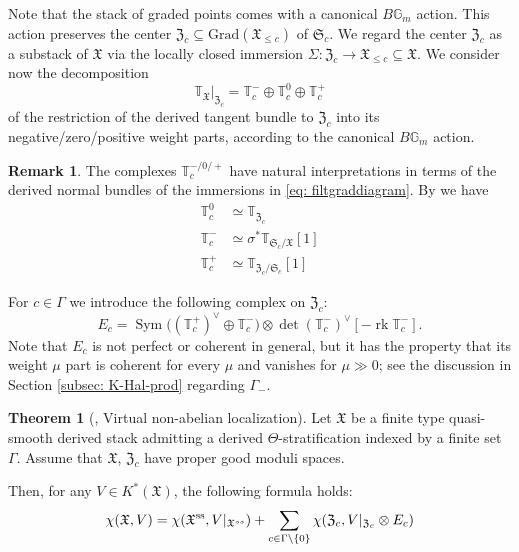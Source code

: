 \documentclass[12pt]{amsart}
\theoremstyle{definition}
\newtheorem{theorem}[definition]{Theorem}
\newtheorem{remark}[definition]{Remark}
\newcommand{\BG}{{\mathbb{G}}}
\newcommand{\BT}{{\mathbb{T}}}
\newcommand{\1}{\mathbf 1}
\newcommand{\FX}{{\mathfrak{X}}}
\newcommand{\FZ}{{\mathfrak{Z}}}
\newcommand{\FS}{{\mathfrak{S}}}
\DeclareMathOperator{\Sym}{Sym}
\newcommand{\Grad}{\mathrm{Grad}}
\begin{document}
Note that the stack of graded points comes with a canonical $B\BG_m$ action. This action preserves the center $\FZ_c\subseteq \Grad(\FX_{\leq c})$ of $\FS_c$. We regard the center $\FZ_c$ as a substack of $\FX$ via the locally closed immersion $\Sigma\colon \FZ_c\to \FX_{\leq c}\subseteq \FX$. We consider now the decomposition
\[\BT_\FX|_{\FZ_c}=\BT_c^-\oplus\BT_c^0\oplus \BT_c^+\]
of the restriction of the derived tangent bundle to $\FZ_c$ into its negative/zero/positive weight parts, according to the canonical $B\BG_m$ action. 

\begin{remark}\label{rmk: interpretationL-+}
The complexes $\BT_c^{-/0/+}$ have natural interpretations in terms of the derived normal bundles of the immersions in \eqref{eq: filtgraddiagram}. By \cite[Lemma 1.3.2, Lemma 1.5.5]{HLderived} we have
\begin{align*}
    \BT_c^0&\simeq \BT_{\FZ_c}\\
    \BT_c^-&\simeq \sigma^\ast\BT_{\FS_c/\FX}[1]\\
    \BT_c^+&\simeq \BT_{\FZ_c/\FS_c}[1]
\end{align*}
\end{remark}


For $c\in \Gamma$ we introduce the following complex on $\FZ_c$:
\begin{equation}\label{eq: complcorr}E_c=\Sym \big((\mathbb T_{c}^+)^\vee \oplus \mathbb T_{c}^-\big) \otimes \operatorname{det}(\mathbb T_{c}^-)^{\vee}[-\operatorname{rk} \mathbb T_{c}^-].\end{equation}
Note that $E_c$ is not perfect or coherent in general, but it has the property that its weight $\mu$ part is coherent for every $\mu$ and vanishes for $\mu\gg 0$; see the discussion in Section \ref{subsec: K-Hal-prod} regarding $\Gamma_-$.


\begin{theorem}[{\cite[Corollary 3.16]{HLNAL}}, Virtual non-abelian localization]\label{thm: NAloc} Let $\FX$ be a finite type quasi-smooth derived stack admitting a derived $\Theta$-stratification indexed by a finite set~$\Gamma$. Assume that $\FX$, $\FZ_c$ have proper good moduli spaces.

Then, for any $V \in K^\ast(\FX)$, the following formula holds:
\begin{equation}\label{eq: NAloc}\chi(\FX, V) = \chi(\mathcal \FX^{\textup{ss}}, V|_{\mathcal \FX^{ss}}) + \sum_{c\in \Gamma\setminus \{0\}} \chi(\FZ_{c}, V|_{\FZ_{c}} \otimes E_{c})\end{equation}
\end{theorem}
\end{document}
